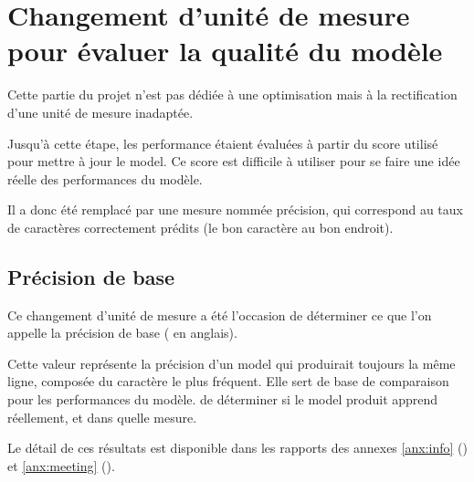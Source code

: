 \section{Changement d'unité de mesure pour évaluer la qualité du modèle}
Cette partie du projet n'est pas dédiée à une optimisation mais à la rectification d'une unité de mesure inadaptée.

Jusqu'à cette étape, les performance étaient évaluées à partir du score utilisé pour mettre à jour le \gls{model}. Ce score est difficile à utiliser pour se faire une idée réelle des performances du modèle. 

Il a donc été remplacé par une mesure nommée \og précision\fg{}, qui correspond au taux de caractères correctement prédits (le bon caractère au bon endroit).

\subsection{Précision de base}
Ce changement d'unité de mesure a été l'occasion de déterminer ce que l'on appelle la précision de base ( en anglais).

Cette valeur représente la précision d'un \gls{model} qui produirait toujours la même ligne, composée du caractère le plus fréquent. Elle sert de base de comparaison pour les performances du modèle.
  de déterminer si le \gls{model} produit apprend réellement, et dans quelle mesure.

Le détail de ces résultats est disponible dans les rapports des annexes \ref{anx:info} () et \ref{anx:meeting} ().
